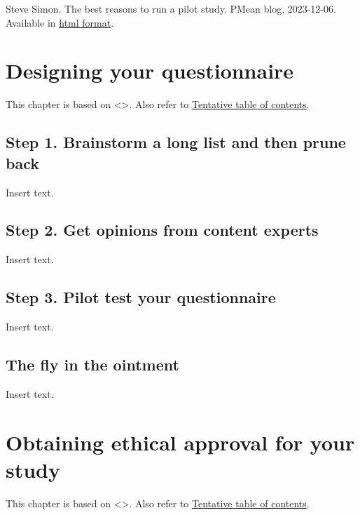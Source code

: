 \documentclass[
  letterpaper,
  DIV=11,
  numbers=noendperiod]{scrreprt}
\begin{document}
Steve Simon. The best reasons to run a pilot study. PMean blog,
2023-12-06. Available in
\href{http://new.pmean.com/reasons-to-run-a-pilot/}{html format}.


\chapter{Designing your
questionnaire}\label{designing-your-questionnaire}

This chapter is based on \textless{}\textgreater. Also refer to
\href{http://www.pmean.com/10/Contents.html}{Tentative table of
contents}.

\section{Step 1. Brainstorm a long list and then prune
back}\label{step-1.-brainstorm-a-long-list-and-then-prune-back}

Insert text.

\section{Step 2. Get opinions from content
experts}\label{step-2.-get-opinions-from-content-experts}

Insert text.

\section{Step 3. Pilot test your
questionnaire}\label{step-3.-pilot-test-your-questionnaire}

Insert text.

\section{The fly in the ointment}\label{the-fly-in-the-ointment-3}

Insert text.


\chapter{Obtaining ethical approval for your
study}\label{obtaining-ethical-approval-for-your-study}

This chapter is based on \textless{}\textgreater. Also refer to
\href{http://www.pmean.com/10/Contents.html}{Tentative table of
contents}.
\end{document}
